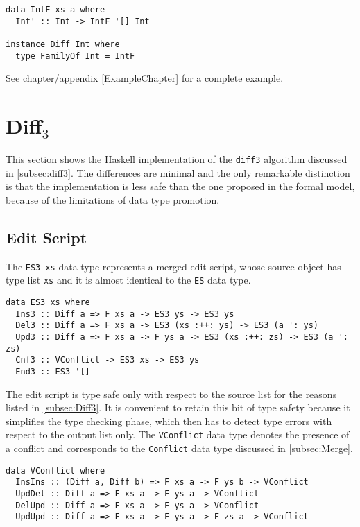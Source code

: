 \documentclass[../Thesis.tex]{subfiles}
\begin{document}
\begin{verbatim}
data IntF xs a where
  Int' :: Int -> IntF '[] Int

instance Diff Int where
  type FamilyOf Int = IntF
\end{verbatim}

	See chapter/appendix \ref{ExampleChapter} for a complete example.
	
	\section{Diff$_3$}
	This section shows the Haskell implementation of the
	\texttt{diff3} algorithm discussed in \ref{subsec:diff3}.
	The differences are minimal and the only remarkable distinction
	is that the implementation is less safe than the one
	proposed in the formal model, because of the limitations
	of data type promotion.
	

	\subsection{Edit Script}
	\label{subsec:ES3}
	The \texttt{ES3 xs} data type represents a merged edit script,
	whose source object has type list \texttt{xs} and it
	is almost identical to the \texttt{ES} data type.
	
\begin{verbatim}
data ES3 xs where
  Ins3 :: Diff a => F xs a -> ES3 ys -> ES3 ys
  Del3 :: Diff a => F xs a -> ES3 (xs :++: ys) -> ES3 (a ': ys) 
  Upd3 :: Diff a => F xs a -> F ys a -> ES3 (xs :++: zs) -> ES3 (a ': zs) 
  Cnf3 :: VConflict -> ES3 xs -> ES3 ys
  End3 :: ES3 '[] 
\end{verbatim}

	The edit script is type safe only with respect
	to the source list for the reasons listed in \ref{subsec:Diff3}.	
	It is convenient to retain this bit of type safety because it 
	simplifies the type checking phase, which then has to detect type 
	errors with respect to the output list only.
	The \texttt{VConflict} data type denotes the presence
	of a conflict and corresponds to the \texttt{Conflict}
	data type discussed in \ref{subsec:Merge}.
\begin{verbatim}
data VConflict where
  InsIns :: (Diff a, Diff b) => F xs a -> F ys b -> VConflict
  UpdDel :: Diff a => F xs a -> F ys a -> VConflict
  DelUpd :: Diff a => F xs a -> F ys a -> VConflict
  UpdUpd :: Diff a => F xs a -> F ys a -> F zs a -> VConflict
\end{verbatim}
\end{document}
